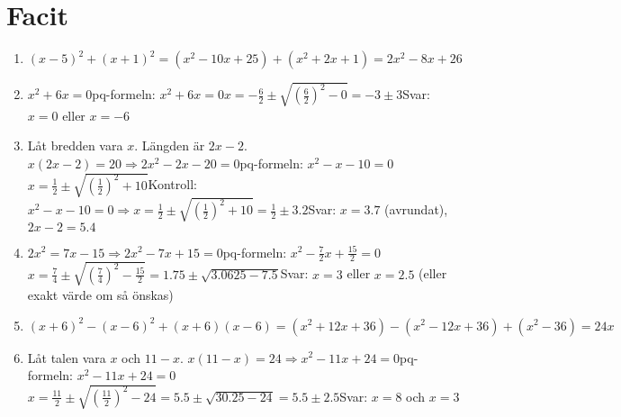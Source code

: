 \documentclass[12pt]{article}
\begin{document}
\section*{Facit}
\begin{enumerate}[label=\textbf{\arabic*.}]
    \item $(x-5)^2 + (x+1)^2 = (x^2-10x+25) + (x^2+2x+1) = 2x^2 - 8x + 26$
    \item $x^2 + 6x = 0$\newline pq-formeln: $x^2 + 6x = 0$\newline $x = -\frac{6}{2} \pm \sqrt{\left(\frac{6}{2}\right)^2 - 0} = -3 \pm 3$\newline Svar: $x=0$ eller $x=-6$
    \item Låt bredden vara $x$. Längden är $2x-2$. $x(2x-2)=20 \Rightarrow 2x^2-2x-20=0$\newline pq-formeln: $x^2-x-10=0$\newline $x = \frac{1}{2} \pm \sqrt{\left(\frac{1}{2}\right)^2 + 10}$\newline Kontroll: $x^2-x-10=0 \Rightarrow x = \frac{1}{2} \pm \sqrt{\left(\frac{1}{2}\right)^2 + 10} = \frac{1}{2} \pm 3.2$\newline Svar: $x=3.7$ (avrundat), $2x-2=5.4$
    \item $2x^2 = 7x - 15 \Rightarrow 2x^2 - 7x + 15 = 0$\newline pq-formeln: $x^2 - \frac{7}{2}x + \frac{15}{2} = 0$\newline $x = \frac{7}{4} \pm \sqrt{\left(\frac{7}{4}\right)^2 - \frac{15}{2}} = 1.75 \pm \sqrt{3.0625 - 7.5}$\newline Svar: $x=3$ eller $x=2.5$ (eller exakt värde om så önskas)
    \item $(x+6)^2 - (x-6)^2 + (x+6)(x-6) = (x^2+12x+36)-(x^2-12x+36)+(x^2-36) = 24x$
    \item Låt talen vara $x$ och $11-x$. $x(11-x)=24 \Rightarrow x^2-11x+24=0$\newline pq-formeln: $x^2 - 11x + 24 = 0$\newline $x = \frac{11}{2} \pm \sqrt{\left(\frac{11}{2}\right)^2 - 24} = 5.5 \pm \sqrt{30.25 - 24} = 5.5 \pm 2.5$\newline Svar: $x=8$ och $x=3$
\end{enumerate}
\end{document}
